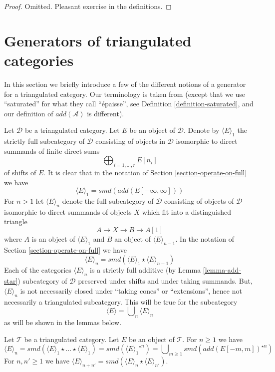 \begin{proof}
Omitted. Pleasant exercise in the definitions.
\end{proof}





\section{Generators of triangulated categories}
\label{section-generators}

\noindent
In this section we briefly introduce a few of the different notions
of a generator for a triangulated category. Our terminology is
taken from \cite{BvdB} (except that we use ``saturated'' for what
they call ``\'epaisse'', see Definition \ref{definition-saturated}, and
our definition of $add(\mathcal{A})$ is different).

\medskip\noindent
Let $\mathcal{D}$ be a triangulated category. Let $E$ be an object
of $\mathcal{D}$. Denote by $\langle E \rangle_1$ the strictly full subcategory
of $\mathcal{D}$ consisting of objects in $\mathcal{D}$ isomorphic to
direct summands of finite direct sums
$$
\bigoplus\nolimits_{i = 1, \ldots, r} E[n_i]
$$
of shifts of $E$. It is clear that in the notation of
Section \ref{section-operate-on-full} we have
$$
\langle E \rangle_1 = smd(add(E[-\infty, \infty]))
$$
For $n > 1$ let $\langle E \rangle_n$ denote the full
subcategory of $\mathcal{D}$ consisting of objects of $\mathcal{D}$
isomorphic to direct summands of objects $X$ which fit into a distinguished
triangle
$$
A \to X \to B \to A[1]
$$
where $A$ is an object of $\langle E \rangle_1$ and $B$ an object of
$\langle E \rangle_{n - 1}$. In the notation of
Section \ref{section-operate-on-full} we have
$$
\langle E \rangle_n = smd(\langle E \rangle_1 \star \langle E \rangle_{n - 1})
$$
Each of the categories $\langle E \rangle_n$ is a strictly full additive
(by Lemma \ref{lemma-add-star}) subcategory of $\mathcal{D}$ preserved
under shifts and under taking summands. But, $\langle E \rangle_n$ is not
necessarily closed under ``taking cones'' or ``extensions'', hence not
necessarily a triangulated subcategory. This will be true for the
subcategory
$$
\langle E \rangle = \bigcup\nolimits_n \langle E \rangle_n
$$
as will be shown in the lemmas below.

\begin{lemma}
\label{lemma-generated-by-E-explicit}
Let $\mathcal{T}$ be a triangulated category. Let $E$ be an object
of $\mathcal{T}$. For $n \geq 1$ we have
$$
\langle E \rangle_n =
smd(\langle E \rangle_1 \star \ldots \star \langle E \rangle_1) =
smd({\langle E \rangle_1}^{\star n}) =
\bigcup\nolimits_{m \geq 1} smd(add(E[-m, m])^{\star n})
$$
For $n, n' \geq 1$ we have $\langle E \rangle_{n + n'} =
smd(\langle E \rangle_n \star \langle E \rangle_{n'})$.
\end{lemma}

